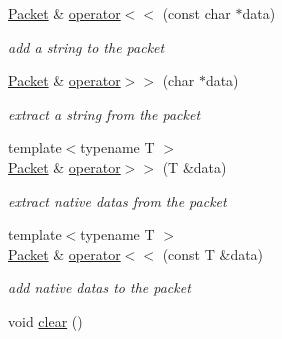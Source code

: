 \begin{DoxyCompactItemize}
\hyperlink{classmognetwork_1_1_packet}{Packet} \& \hyperlink{classmognetwork_1_1_packet_a9f73147d9c2ddab57757a27aa110de0f}{operator$<$$<$} (const char $\ast$data)
\begin{DoxyCompactList}\small\item\em add a string to the packet \end{DoxyCompactList}\item 
\hyperlink{classmognetwork_1_1_packet}{Packet} \& \hyperlink{classmognetwork_1_1_packet_ab2a38323cc0a32e79520fdf71ee0d1a9}{operator$>$$>$} (char $\ast$data)
\begin{DoxyCompactList}\small\item\em extract a string from the packet \end{DoxyCompactList}\item 
{\footnotesize template$<$typename T $>$ }\\\hyperlink{classmognetwork_1_1_packet}{Packet} \& \hyperlink{classmognetwork_1_1_packet_acdecf105b9afb3c4c499bfffa9cf2fbb}{operator$>$$>$} (T \&data)
\begin{DoxyCompactList}\small\item\em extract native datas from the packet \end{DoxyCompactList}\item 
{\footnotesize template$<$typename T $>$ }\\\hyperlink{classmognetwork_1_1_packet}{Packet} \& \hyperlink{classmognetwork_1_1_packet_a84ffd95a38d7bca83675a5c932d04735}{operator$<$$<$} (const T \&data)
\begin{DoxyCompactList}\small\item\em add native datas to the packet \end{DoxyCompactList}\item 
\hypertarget{classmognetwork_1_1_packet_aaa034856ddb45ebf35dcefd6d58563d9}{void \hyperlink{classmognetwork_1_1_packet_aaa034856ddb45ebf35dcefd6d58563d9}{clear} ()}\label{classmognetwork_1_1_packet_aaa034856ddb45ebf35dcefd6d58563d9}


\end{DoxyCompactItemize}
